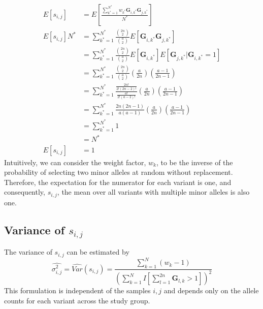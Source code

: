 \begin{align*}
E\left[s_{i,j}\right] & =E\left[\frac{\sum_{k^{*}=1}^{N^{*}}w_{k^{*}}\mathbf{G}_{i,k^{*}}\mathbf{G}_{j,k^{*}}}{N^{*}}\right]\\
E\left[s_{i,j}\right]N^{*} & =\sum_{k^{*}=1}^{N^{*}}\frac{{2n \choose 2}}{{a \choose 2}}E\left[\mathbf{G}_{i,k^{*}}\mathbf{G}_{j,k^{*}}\right]\\
 & =\sum_{k^{*}=1}^{N^{*}}\frac{{2n \choose 2}}{{a \choose 2}}E\left[\mathbf{G}_{i,k^{*}}\right]E\left[\mathbf{G}_{j,k^{*}}|\mathbf{G}_{i,k^{*}}=1\right]\\
 & =\sum_{k^{*}=1}^{N^{*}}\frac{{2n \choose 2}}{{a \choose 2}}\left(\frac{a}{2n}\right)\left(\frac{a-1}{2n-1}\right)\\
 & =\sum_{k^{*}=1}^{N^{*}}\frac{\frac{2n!}{2!\left(2n-2\right)!}}{\frac{a!}{2!\left(a-2\right)!}}\left(\frac{a}{2n}\right)\left(\frac{a-1}{2n-1}\right)\\
 & =\sum_{k^{*}=1}^{N^{*}}\frac{2n\left(2n-1\right)}{a\left(a-1\right)}\left(\frac{a}{2n}\right)\left(\frac{a-1}{2n-1}\right)\\
 & =\sum_{k^{*}=1}^{N^{*}}1\\
 & =N^{*}\\
E\left[s_{i,j}\right] & =1
\end{align*}
Intuitively, we can consider the weight factor, $w_{k}$, to be the
inverse of the probability of selecting two minor alleles at random
without replacement. Therefore, the expectation for the numerator
for each variant is one, and consequently, $s_{i,j}$, the mean over
all variants with multiple minor alleles is also one.

\subsection{Variance of $s_{i,j}$}

The variance of $s_{i,j}$ can be estimated by 
\[
\hat{\sigma_{i,j}^{2}}=\hat{Var}\left(s_{i,j}\right)=\frac{\sum_{k=1}^{N}\left(w_{k}-1\right)}{\left(\sum_{k=1}^{N}I\left[\sum_{l=1}^{2n}\mathbf{G}_{l,k}>1\right]\right)^{2}}
\]
This formulation is independent of the samples $i,j$ and depends
only on the allele counts for each variant across the study group.

